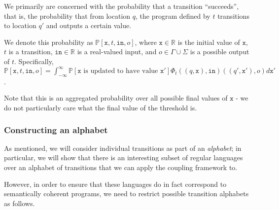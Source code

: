 \documentclass[12pt]{article}
\newcommand{\RR}{\mathbb{R}}
\newcommand{\PP}{\mathbb{P}}
\theoremstyle{definition}
\begin{document}
We primarily are concerned with the probability that a transition ``succeeds'', that is, the probability that from location $q$, the program defined by $t$ transitions to location $q'$ and outputs a certain value. 

We denote this probability as $\PP[\texttt{x}, t, \texttt{in}, o]$, where $\texttt{x} \in \RR$ is the initial value of $\texttt{x}$, $t$ is a transition, $\texttt{in}\in \RR$ is a real-valued input, and $o\in \Gamma\cup\Sigma$ is a possible output of $t$. Specifically, $\PP[\texttt{x}, t, \texttt{in}, o] = \int_{-\infty}^\infty\PP[\texttt{x}\text{ is updated to have value }\texttt{x}']\Phi_t((q, \texttt{x}), \texttt{in})((q', \texttt{x}'), o)d\texttt{x}'$.

Note that this is an aggregated probability over all possible final values of $\texttt{x}$ - we do not particularly care what the final value of the threshold is. 


\subsubsection{Constructing an alphabet}

As mentioned, we will consider individual transitions as part of an \textit{alphabet}; in particular, we will show that there is an interesting subset of regular languages over an alphabet of transitions that we can apply the coupling framework to. 

However, in order to ensure that these languages do in fact correspond to semantically coherent programs, we need to restrict possible transition alphabets as follows. 
\end{document}
